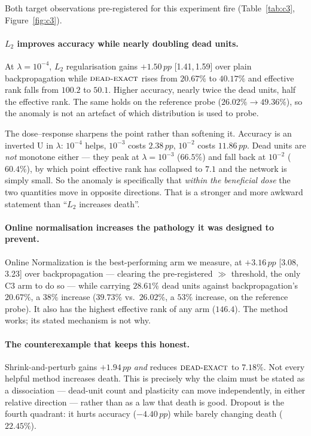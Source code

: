 \documentclass[10pt]{article}
\newcommand{\dexact}{\textsc{dead-exact}}
\newcommand{\pp}{\,pp}
\newcommand{\ci}[2]{{\footnotesize[#1,\,#2]}}
\begin{document}
Both target observations pre-registered for this experiment fire
(Table~\ref{tab:c3}, Figure~\ref{fig:c3}).

\paragraph{$L_2$ improves accuracy while nearly doubling dead units.}
At $\lambda = 10^{-4}$, $L_2$ regularisation gains $+1.50\pp$ \ci{1.41}{1.59}
over plain backpropagation while $\dexact$ rises from $20.67\%$ to $40.17\%$ and
effective rank falls from $100.2$ to $50.1$. Higher accuracy, nearly twice the
dead units, half the effective rank. The same holds on the reference probe
($26.02\% \to 49.36\%$), so the anomaly is not an artefact of which distribution
is used to probe.

The dose--response sharpens the point rather than softening it. Accuracy is an
inverted U in $\lambda$: $10^{-4}$ helps, $10^{-3}$ costs $2.38\pp$, $10^{-2}$
costs $11.86\pp$. Dead units are \emph{not} monotone either --- they peak at
$\lambda = 10^{-3}$ ($66.5\%$) and fall back at $10^{-2}$ ($60.4\%$), by which
point effective rank has collapsed to $7.1$ and the network is simply small. So
the anomaly is specifically that \emph{within the beneficial dose} the two
quantities move in opposite directions. That is a stronger and more awkward
statement than ``$L_2$ increases death''.

\paragraph{Online normalisation increases the pathology it was designed to
prevent.}
Online Normalization \citep{chiley2019online} is the best-performing arm we
measure, at $+3.16\pp$ \ci{3.08}{3.23} over backpropagation --- clearing the
pre-registered $\gg$ threshold, the only C3 arm to do so --- while carrying
$28.61\%$ dead units against backpropagation's $20.67\%$, a $38\%$ increase
($39.73\%$ vs.\ $26.02\%$, a $53\%$ increase, on the reference probe). It also
has the highest effective rank of any arm ($146.4$). The method works; its
stated mechanism is not why.

\paragraph{The counterexample that keeps this honest.}
Shrink-and-perturb \citep{ash2020warm} gains $+1.94\pp$ \emph{and} reduces
$\dexact$ to $7.18\%$. Not every helpful method increases death. This is
precisely why the claim must be stated as a dissociation --- dead-unit count and
plasticity can move independently, in either relative direction --- rather than
as a law that death is good. Dropout is the fourth quadrant: it hurts accuracy
($-4.40\pp$) while barely changing death ($22.45\%$).
\end{document}
